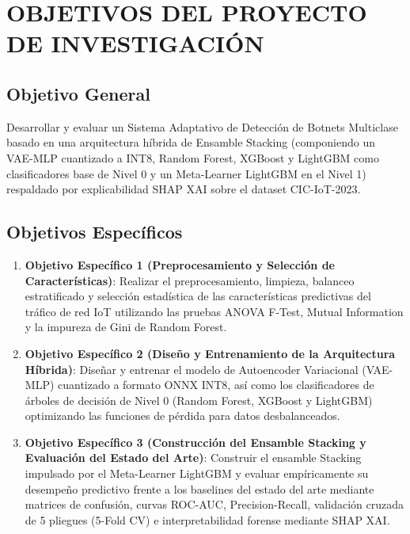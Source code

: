 \section{OBJETIVOS DEL PROYECTO DE INVESTIGACIÓN}

\subsection{Objetivo General}
Desarrollar y evaluar un Sistema Adaptativo de Detección de Botnets Multiclase basado en una arquitectura híbrida de Ensamble Stacking (componiendo un VAE-MLP cuantizado a INT8, Random Forest, XGBoost y LightGBM como clasificadores base de Nivel 0 y un Meta-Learner LightGBM en el Nivel 1) respaldado por explicabilidad SHAP XAI sobre el dataset CIC-IoT-2023.

\subsection{Objetivos Específicos}
\begin{enumerate}[leftmargin=*]
    \item \textbf{Objetivo Específico 1 (Preprocesamiento y Selección de Características)}: Realizar el preprocesamiento, limpieza, balanceo estratificado y selección estadística de las características predictivas del tráfico de red IoT utilizando las pruebas ANOVA F-Test, Mutual Information y la impureza de Gini de Random Forest.
    \item \textbf{Objetivo Específico 2 (Diseño y Entrenamiento de la Arquitectura Híbrida)}: Diseñar y entrenar el modelo de Autoencoder Variacional (VAE-MLP) cuantizado a formato ONNX INT8, así como los clasificadores de árboles de decisión de Nivel 0 (Random Forest, XGBoost y LightGBM) optimizando las funciones de pérdida para datos desbalanceados.
    \item \textbf{Objetivo Específico 3 (Construcción del Ensamble Stacking y Evaluación del Estado del Arte)}: Construir el ensamble Stacking impulsado por el Meta-Learner LightGBM y evaluar empíricamente su desempeño predictivo frente a los baselines del estado del arte mediante matrices de confusión, curvas ROC-AUC, Precision-Recall, validación cruzada de 5 pliegues (5-Fold CV) e interpretabilidad forense mediante SHAP XAI.
\end{enumerate}
